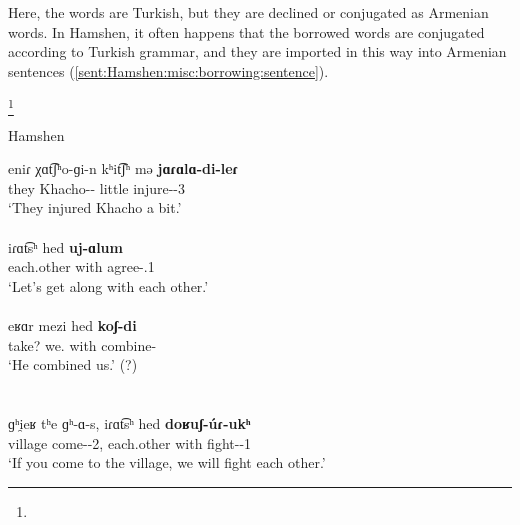 Here, the words are Turkish, but they are declined or conjugated as Armenian words. In Hamshen, it often happens that the borrowed words are conjugated according to Turkish grammar, and they are imported in this way into Armenian sentences (\ref{sent:Hamshen:misc:borrowing:sentence}).

 \footnote{}

 \newpage
\begin{exe}
	\ex Hamshen \label{sent:Hamshen:misc:borrowing:sentence}
	
	
	\begin{xlist}
		\ex \gll eniɾ χɑt͡ʃʰo-ɡi-n kʰit͡ʃʰ mə \textbf{jɑɾɑlɑ-di-leɾ} \\
		they Khacho-{\dat}-{} little {\indf} injure-{\pst}-3{\pl} \\
		\trans `They injured Khacho a bit.'\\
		 \\
		\ex \gll iɾɑt͡sʰ hed \textbf{uj-ɑlum} \\
		each.other with agree-{\opt}.1{\pl} \\
		\trans `Let's get along with each other.' \\
		 \\
		\ex \gll eʁɑr mezi hed \textbf{koʃ-di} \\
		take? we.{\dat} with combine-{\pst} \\
		\trans `He combined us.' (?) \label{sent:Hamshen:misc:borrowing:sentence:kosdi} \\  \\
		 \\
		\ex \gll ɡʰi̯eʁ tʰe ɡʰ-ɑ-s, iɾɑt͡sʰ hed \textbf{doʁuʃ-\'uɾ-ukʰ} \\
		village {\q} come-{\thgloss}-2{\sg}, each.other with fight-{\aor}-1{\pl} \\
		\trans `If you come to the village, we will fight each other.'\\

\end{xlist}
\end{exe}
